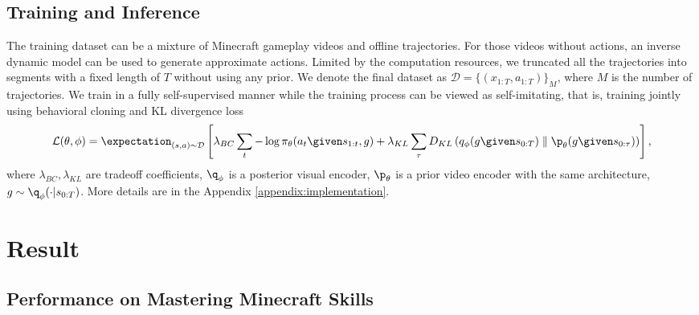 \documentclass[11pt, a4paper, logo, one column]{craftjarvis}
\begin{document}
\subsection{Training and Inference}
The training dataset can be a mixture of Minecraft gameplay videos and offline trajectories. For those videos without actions, an inverse dynamic model \citep{vpt} can be used to generate approximate actions. Limited by the computation resources, we truncated all the trajectories into segments with a fixed length of $T$ without using any prior. We denote the final dataset as $\mathcal{D} = \{(x_{1:T}, a_{1:T})\}_M$, where $M$ is the number of trajectories. We train \agent in a fully self-supervised manner while the training process can be viewed as self-imitating, that is, training \agent jointly using behavioral cloning and KL divergence loss
\begin{align}
\mathcal{L}(\theta,\phi) =  \expectation_{(s,a) \sim \mathcal{D}} \left[ \lambda_{BC} \sum_t -\log \pi_\theta(a_t \given s_{1:t}, g) + \lambda_{KL} \sum_{\tau} D_{KL}\left(q_\phi(g \given s_{0:T} ) \parallel \p_{\theta}(g \given s_{0:\tau} )\right) \right],
\end{align}
where $\lambda_{BC}, \lambda_{KL}$ are tradeoff coefficients, $\q_{\phi}$ is a posterior visual encoder, $\p_{\theta}$ is a prior video encoder with the same architecture, $g \sim \q_{\phi}(\cdot | s_{0:T})$. 
More details are in the Appendix \ref{appendix:implementation}.




\section{Result}

\subsection{Performance on Mastering Minecraft Skills}
\end{document}
